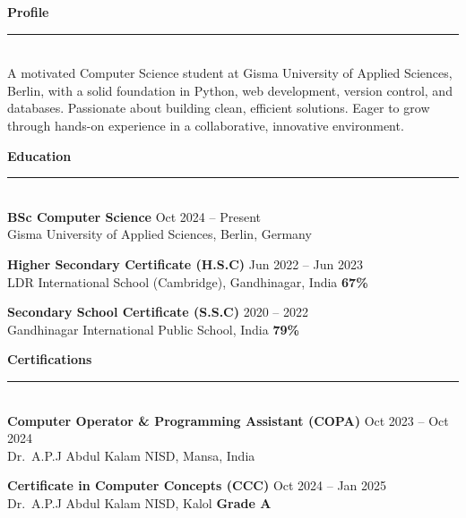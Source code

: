 \documentclass[a4paper,9pt]{article}
\newlength{\mainW}
\newcommand{\mainheading}[1]{%
  \vspace{6pt}%
  {\color{maincolor}\bfseries\normalsize #1}\\[-3pt]%
  {\color{maincolor}\rule{\linewidth}{1pt}}\\[3pt]%
}
\begin{document}
\begin{minipage}[t]{\mainW}
\vspace{0pt}
\hspace{0.4cm}%
\begin{minipage}[t]{\mainW-0.8cm}
\vspace{4pt}

\mainheading{Profile}
{\color{textgray}\footnotesize
A motivated Computer Science student at Gisma University of Applied Sciences, Berlin, with a solid foundation in Python, web development, version control, and databases. Passionate about building clean, efficient solutions. Eager to grow through hands-on experience in a collaborative, innovative environment.
}

\mainheading{Education}

{\color{sidecolor}\bfseries\footnotesize BSc Computer Science} \hfill {\scriptsize\color{maincolor} Oct 2024 -- Present}\\
{\color{textgray}\footnotesize Gisma University of Applied Sciences, Berlin, Germany}

\vspace{4pt}

{\color{sidecolor}\bfseries\footnotesize Higher Secondary Certificate (H.S.C)} \hfill {\scriptsize\color{maincolor} Jun 2022 -- Jun 2023}\\
{\color{textgray}\footnotesize LDR International School (Cambridge), Gandhinagar, India \quad\textbf{67\%}}

\vspace{4pt}

{\color{sidecolor}\bfseries\footnotesize Secondary School Certificate (S.S.C)} \hfill {\scriptsize\color{maincolor} 2020 -- 2022}\\
{\color{textgray}\footnotesize Gandhinagar International Public School, India \quad\textbf{79\%}}

\mainheading{Certifications}

{\color{sidecolor}\bfseries\footnotesize Computer Operator \& Programming Assistant (COPA)} \hfill {\scriptsize\color{maincolor} Oct 2023 -- Oct 2024}\\
{\color{textgray}\footnotesize Dr.\ A.P.J Abdul Kalam NISD, Mansa, India}

\vspace{4pt}

{\color{sidecolor}\bfseries\footnotesize Certificate in Computer Concepts (CCC)} \hfill {\scriptsize\color{maincolor} Oct 2024 -- Jan 2025}\\
{\color{textgray}\footnotesize Dr.\ A.P.J Abdul Kalam NISD, Kalol} \hfill {\scriptsize\color{accentcolor!70!black}\bfseries Grade A}


\end{minipage}
\end{minipage}
\end{document}
